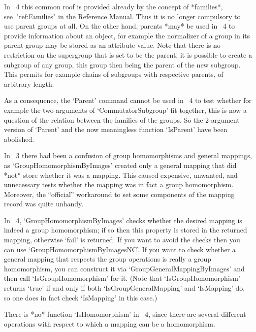 In {\GAP}~4 this common roof is provided already by the concept of
*families*, see~"ref:Families" in the Reference Manual.
Thus it is no longer compulsory to use parent groups at all.
On the other hand, parents *may* be used in {\GAP}~4 to provide
information about an object, for example the normalizer of a group in its
parent group may be stored as an attribute value.
Note that there is no restriction on the supergroup that is set to be
the parent,
it is possible to create a subgroup of
any group, this group then being the parent of the new subgroup.
This permits for example chains of subgroups with respective parents,
of arbitrary length.

As a consequence, the `Parent' command cannot be used in {\GAP}~4
to test whether for example the two arguments of `CommutatorSubgroup'
fit together, this is now a question of the relation between the families
of the groups.
So the 2-argument version of `Parent' and the now meaningless function
`IsParent' have been abolished.



In {\GAP}~3 there had been a confusion of group homomorphisms and general
mappings,
as `GroupHomomorphismByImages' created only a general mapping that did
*not* store whether it was a mapping.
This caused expensive, unwanted, and unnecessary tests whether the
mapping was in fact a group homomorphism.
Moreover, the ``official'' workaround to set some components of the
mapping record was quite unhandy.

In {\GAP}~4, `GroupHomomorphismByImages' checks whether the desired
mapping is indeed a group homomorphism; if so then this property is
stored in the returned mapping, otherwise `fail' is returned.
If you want to avoid the checks then you can use
`GroupHomomorphismByImagesNC'.
If you want to check whether a general mapping that respects the group
operations is really a group homomorphism, you can construct it via
`GroupGeneralMappingByImages' and then call `IsGroupHomomorphism' for it.
(Note that `IsGroupHomomorphism' returns `true' if and only if both
`IsGroupGeneralMapping' and `IsMapping' do,
so one does in fact check `IsMapping' in this case.)

There is *no* function `IsHomomorphism' in {\GAP}~4,
since there are several different operations with respect to which a
mapping can be a homomorphism.



